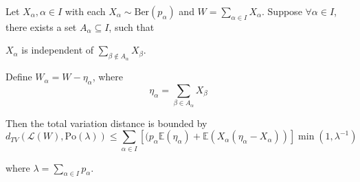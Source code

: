 \documentclass{article}
\begin{document}
\begin{theorem}\label{thm:poisson_stein_local}
    Let $X_\alpha, \alpha \in I$ with each $X_\alpha \sim \text{Ber}(p_\alpha)$ and $W = \sum_{\alpha \in I} X_\alpha$.  
    Suppose $\forall \alpha \in I$, there exists a set $A_\alpha \subseteq I$, such that
    \begin{center}
        $X_\alpha$ is independent of $\sum_{\beta \notin A_\alpha} X_\beta$. 
    \end{center}
    Define $W_\alpha = W - \eta_\alpha$, where
    \begin{equation*}
        \eta_\alpha = \sum_{\beta \in A_\alpha} X_\beta
    \end{equation*}  
    
    Then the total variation distance is bounded by
    \begin{equation*}
        d_{TV}(\mathcal{L}(W), \text{Po}(\lambda)) \leq \sum_{\alpha\in I}[(p_{\alpha}\mathbb{E}(\eta_{\alpha})+\mathbb{E}(X_{\alpha}(\eta_{\alpha}-X_{\alpha}))]\operatorname*{min}\left(1,\lambda^{-1}\right)
    \end{equation*}

    where $\lambda = \sum_{\alpha \in I} p_\alpha$.   
\end{theorem}
\end{document}
